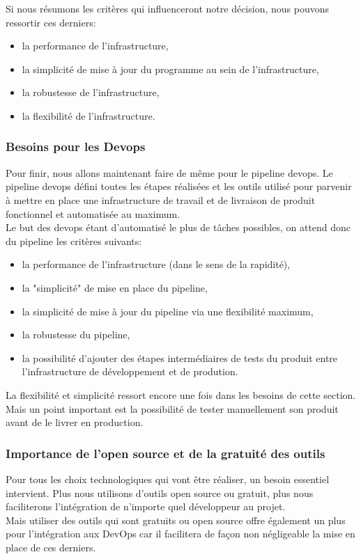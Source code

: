 \documentclass[
    iai, %
    il, %
]{heig-tb}
\begin{document}
Si nous résumons les critères qui influenceront notre décision, nous pouvons ressortir ces derniers:
\begin{itemize}
    \item la performance de l'infrastructure,
    \item la simplicité de mise à jour du programme au sein de l'infrastructure,
    \item la robustesse de l'infrastructure,
    \item la flexibilité de l'infrastructure.
\end{itemize}

\subsubsection{Besoins pour les Devops}
Pour finir, nous allons maintenant faire de même pour le pipeline \Gls{devops}.
Le pipeline \Gls{devops} défini toutes les étapes réalisées et les outils utilisé pour parvenir à mettre en place une infrastructure de travail et de livraison de produit fonctionnel et automatisée au maximum.\\
Le but des \Gls{devops} étant d'automatisé le plus de tâches possibles, on attend donc du pipeline les critères suivants:
\begin{itemize}
    \item la performance de l'infrastructure (dans le sens de la rapidité),
    \item la "simplicité" de mise en place du pipeline,
    \item la simplicité de mise à jour du pipeline via une flexibilité maximum,
    \item la robustesse du pipeline,
    \item la possibilité d'ajouter des étapes intermédiaires de tests du produit entre l'infrastructure de développement et de prodution.
\end{itemize}

La flexibilité et simplicité ressort encore une fois dans les besoins de cette section.
Mais un point important est la possibilité de tester manuellement son produit avant de le livrer en production.

\subsubsection{Importance de l'open source et de la gratuité des outils}
Pour tous les choix technologiques qui vont être réaliser, un besoin essentiel intervient.
Plus nous utilisons d'outils open source ou gratuit, plus nous faciliterons l'intégration de n'importe quel développeur au projet.\\
Mais utiliser des outils qui sont gratuits ou open source offre également un plus pour l'intégration aux DevOps car il facilitera de façon non négligeable la mise en place de ces derniers.
\end{document}
